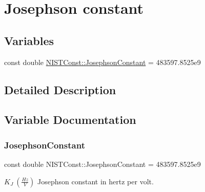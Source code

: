 \hypertarget{group___n_i_s_t_const-_josephson_constant}{}\section{Josephson constant}
\label{group___n_i_s_t_const-_josephson_constant}
\subsection*{Variables}
\begin{DoxyCompactItemize}
\item 
const double \hyperlink{group___n_i_s_t_const-_josephson_constant_gae9f3553a6a6c5eed3df61ad33277cab8}{N\+I\+S\+T\+Const\+::\+Josephson\+Constant} = 483597.\+8525e9
\end{DoxyCompactItemize}


\subsection{Detailed Description}


\subsection{Variable Documentation}
\mbox{\label{group___n_i_s_t_const-_josephson_constant_gae9f3553a6a6c5eed3df61ad33277cab8}} 
\subsubsection{\texorpdfstring{Josephson\+Constant}{JosephsonConstant}}
{\footnotesize\ttfamily const double N\+I\+S\+T\+Const\+::\+Josephson\+Constant = 483597.\+8525e9}

$K_J \ (\frac{Hz}{V})$ Josephson constant in hertz per volt. 